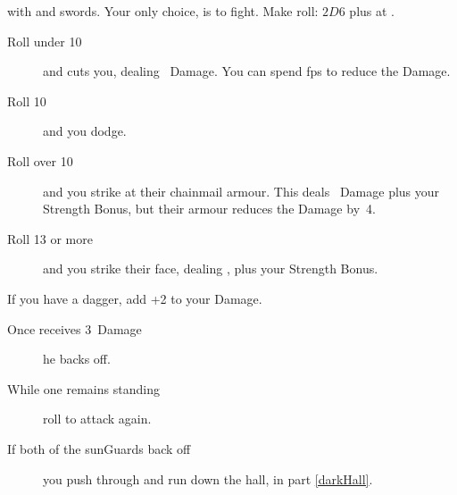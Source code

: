 with  and swords.
Your only choice, is to fight.
Make  roll: $2D6$ plus  at \tn[10].

\begin{description}
  \item[Roll under 10]
  and  cuts you, dealing ~Damage.
  You can spend \glspl{fp} to reduce the Damage.
  \item[Roll 10]
  and you dodge.
  \item[Roll over 10]
  and you strike at their chainmail armour.
  This deals ~Damage plus your Strength Bonus, but their armour reduces the Damage by~4.
  \item[Roll 13 or more]
  and you strike their face, dealing , plus your Strength Bonus.
\end{description}

If you have a dagger, add +2 to your Damage.

\begin{description}
  \item[Once  receives 3~Damage]
  he backs off.
  \item[While one remains standing]
  roll to attack again.
  \item[If both of the \glspl{sunGuard} back off]
  you push through and run down the hall, in part \vref{darkHall}.
\end{description}

